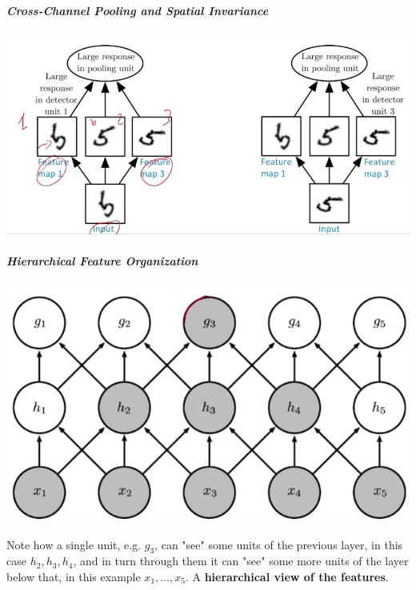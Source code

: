 \documentclass[10pt]{report}
\begin{document}
\subparagraph{Cross-Channel Pooling and Spatial Invariance}
\begin{center}
	\includegraphics[scale=0.33]{60.png}
\end{center}
\subparagraph{Hierarchical Feature Organization}
\begin{center}
	\includegraphics[scale=0.5]{61.png}
\end{center}
Note how a single unit, e.g. $g_3$, can "see" some units of the previous layer, in this case $h_2, h_3, h_4$, and in turn through them it can "see" some more units of the layer below that, in this example $x_1,\ldots,x_5$. A \textbf{hierarchical view of the features}.
\end{document}
